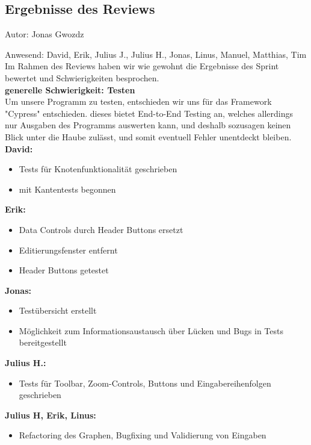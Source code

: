 \subsection{Ergebnisse des Reviews}
{\small Autor: Jonas Gwozdz}

Anwesend: David, Erik, Julius J., Julius H., Jonas, Linus, Manuel, Matthias, Tim\\

Im Rahmen des Reviews haben wir wie gewohnt die Ergebnisse des Sprint bewertet und Schwierigkeiten besprochen.\\

\textbf{generelle Schwierigkeit: Testen}\\
Um unsere Programm zu testen, entschieden wir uns für das Framework "Cypress" entschieden. dieses bietet End-to-End Testing an, welches allerdings nur Ausgaben des Programms auswerten kann, und deshalb sozusagen keinen Blick unter die Haube zulässt, und somit eventuell Fehler unentdeckt bleiben. \\

\textbf{David:}
\begin{itemize}
\item Tests für Knotenfunktionalität geschrieben
\item mit Kantentests begonnen
\end{itemize}

\textbf{Erik:}
\begin{itemize}
\item Data Controls durch Header Buttons ersetzt
\item Editierungsfenster entfernt
\item Header Buttons getestet
\end{itemize}

\textbf{Jonas:}
\begin{itemize}
\item Testübersicht erstellt
\item Möglichkeit zum Informationsaustausch über Lücken und Bugs in Tests bereitgestellt
\end{itemize}

\textbf{Julius H.:}
\begin{itemize}
\item Tests für Toolbar, Zoom-Controls, Buttons und Eingabereihenfolgen geschrieben
\end{itemize}

\textbf{Julius H, Erik, Linus:}
\begin{itemize}
\item Refactoring des Graphen, Bugfixing und Validierung von Eingaben
\end{itemize}

